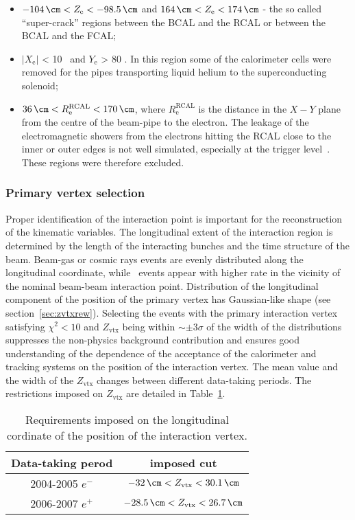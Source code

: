 \begin{itemize}
	\begin{itemize}
		\item $ -104\, \cm < Z_\text{e} < -98.5\, \cm	$ and $ 164\, \cm < Z_\text{e} < 174\, \cm $ - the so called ``super-crack'' regions between the BCAL and the RCAL or between the BCAL and the FCAL;
		\item $\left| X_\text{e} \right|$ < 10 \cm\, and $Y_\text{e}$ > 80 \cm. In this region some of the calorimeter cells were removed for the  pipes transporting  liquid helium to the superconducting solenoid;
		\item $ 36\, \cm < R^\text{RCAL}_\text{e} < 170\, \cm $, where $R^\text{RCAL}_\text{e}$ is the distance in the $X-Y$ plane from the centre of the beam-pipe to the electron. The leakage of the electromagnetic showers from the electrons hitting the RCAL close to the inner or outer edges is not well simulated, especially at the trigger level~\cite{januschek-p96}. These regions were therefore excluded. 
	\end{itemize}
\end{itemize}

\subsubsection{Primary vertex selection}
\label{subsubsec:vtxselect}
Proper identification of the interaction point is important for the reconstruction of the kinematic variables. The longitudinal extent of the interaction region is determined by the length of the interacting bunches and the time structure of the beam. Beam-gas or cosmic rays events are evenly distributed along the longitudinal coordinate, while \ep\, events appear with higher rate in the vicinity of the nominal beam-beam interaction point. Distribution of the longitudinal component of the position of the primary vertex has Gaussian-like shape (see section~\ref{sec:zvtxrew}). Selecting the events with the primary interaction vertex satisfying $\chi^2 < 10$ and $Z_\text{vtx}$ being within $\sim \pm 3\sigma$ of the width of the distributions suppresses the non-physics background contribution and ensures good understanding of the dependence of the acceptance of the calorimeter and tracking systems on the position of the interaction vertex. The mean value and the width of the $Z_\text{vtx}$ changes between different data-taking periods. The restrictions imposed on $Z_\text{vtx}$ are detailed in Table~\ref{tab:zvxcut}.
\begin{table}[htbp]
	\centering
		\begin{tabular}{|c|c|}
			\hline
			Data-taking perod & imposed cut \\
			\hline
			\hline
			2004-2005 $e^{-}$ & $-32\,\cm<Z_\text{vtx}<30.1\,\cm$ \\
			2006-2007 $e^{+}$ & $-28.5\,\cm<Z_\text{vtx}<26.7\,\cm$ \\
			\hline
		\end{tabular}
	\caption{Requirements imposed on the longitudinal cordinate of the position of the interaction vertex.}
	\label{tab:zvxcut}
\end{table}

